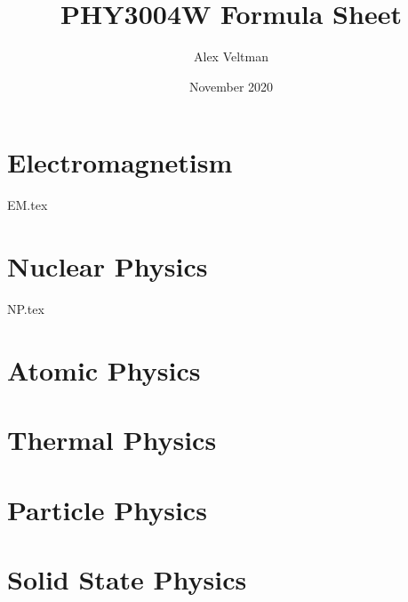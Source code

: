 \documentclass[a4paper, twocolumn]{article}
\title{PHY3004W Formula Sheet}
\author{Alex Veltman}
\date{November 2020}
\makeatletter
\numberwithin{equation}{section}
\renewcommand{\maketitle} %
{ \begingroup \vskip 10pt \begin{center} \large {\bf \@title}
	\vskip 10pt \large \@author \hskip 20pt \@date \end{center}
  \vskip 10pt \endgroup \setcounter{footnote}{0} }
\makeatother
\begin{document}
\maketitle

\section{Electromagnetism}
{EM.tex}

\section{Nuclear Physics}
{NP.tex}

\section{Atomic Physics}

\section{Thermal Physics}

\section{Particle Physics}

\section{Solid State Physics}
\end{document}
